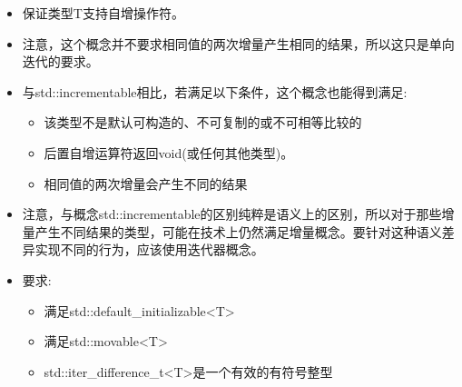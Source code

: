 
\begin{itemize}
\item
保证类型T支持自增操作符。

\item
注意，这个概念并不要求相同值的两次增量产生相同的结果，所以这只是单向迭代的要求。

\item
与std::incrementable相比，若满足以下条件，这个概念也能得到满足:

\begin{itemize}
\item
该类型不是默认可构造的、不可复制的或不可相等比较的

\item
后置自增运算符返回void(或任何其他类型)。

\item
相同值的两次增量会产生不同的结果
\end{itemize}

\item
注意，与概念std::incrementable的区别纯粹是语义上的区别，所以对于那些增量产生不同结果的类型，可能在技术上仍然满足增量概念。要针对这种语义差异实现不同的行为，应该使用迭代器概念。

\item
要求:
\begin{itemize}
\item
满足std::default\_initializable<T>

\item
满足std::movable<T>

\item
std::iter\_difference\_t<T>是一个有效的有符号整型
\end{itemize}
\end{itemize}


